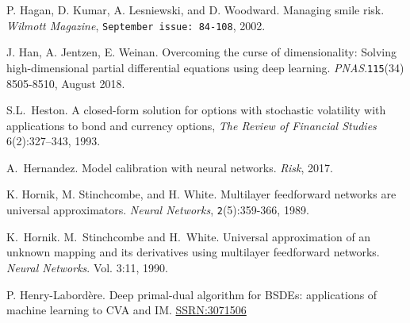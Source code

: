 \documentclass{article}
\theoremstyle{remark}
\begin{document}
\begin{thebibliography}{99}


P. Hagan, D. Kumar, A. Lesniewski, and D. Woodward. Managing smile risk. \textit{Wilmott Magazine}, {\tt September issue: 84-108}, 2002.



J. Han, A. Jentzen, E. Weinan.
Overcoming the curse of dimensionality: Solving high-dimensional partial differential equations using deep learning.
\textit{PNAS}.{\tt 115}(34) 8505-8510, August 2018.


S.L.~Heston. A closed-form solution for options with stochastic
  volatility with applications to bond and currency options, \textit{The Review of Financial Studies} 6(2):327--343, 1993.

A.~Hernandez. Model calibration with neural networks. \textit{Risk}, 2017.    


K. Hornik, M. Stinchcombe, and H. White. 
Multilayer feedforward networks are universal approximators. 
\textit{Neural Networks}, {\tt 2}(5):359-366, 1989.


K.~Hornik. M.~Stinchcombe and H.~White. Universal approximation of an unknown mapping and its derivatives using multilayer feedforward networks. \textit{Neural Networks}.
Vol. 3:11, 1990.



P. Henry-Labord\`{e}re.
Deep primal-dual algorithm for BSDEs: applications of machine learning to CVA and IM. 
\href{https://ssrn.com/abstract=3071506}{SSRN:3071506}


\end{thebibliography}
\end{document}
